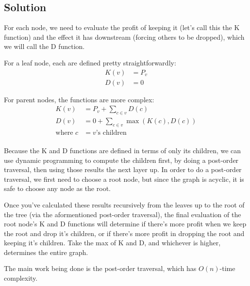 \subsection*{Solution}
For each node, we need to evaluate the profit of keeping it (let's call this the K function) and the effect it has downstream (forcing others to be dropped), which we will call the D function.

For a leaf node, each are defined pretty straightforwardly:
\begin{align*}
K(v) &= P_v \\
D(v) &= 0
\end{align*}

For parent nodes, the functions are more complex:
\begin{align*}
   K(v) &= P_v + \sum_{c \in v}^{} D(c) \\
   D(v) &= 0 + \sum_{c \in v}^{} \max({K(c)},{D(c)}) \\
  \text{where }c &= v\text{'s children} \\
\end{align*}

Because the K and D functions are defined in terms of only its children, we can use dynamic programming to compute the children first, by doing a post-order traversal, then using those results the next layer up. In order to do a post-order traversal, we first need to choose a root node, but since the graph is acyclic, it is safe to choose any node as the root.

Once you've calculated these results recursively from the leaves up to the root of the tree (via the aformentioned post-order traversal), the final evaluation of the root node's K and D functions will determine if there's more profit when we keep the root and drop it's children, or if there's more profit in dropping the root and keeping it's children. Take the max of K and D, and whichever is higher, determines the entire graph.

The main work being done is the post-order traversal, which has $O(n)$-time complexity.
